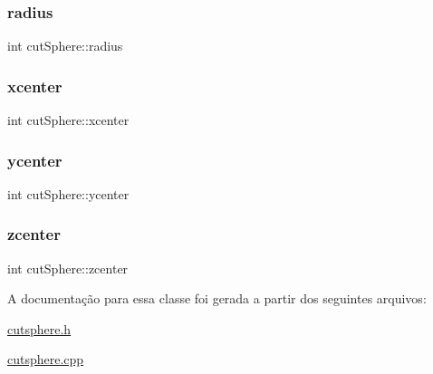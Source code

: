 \subsubsection{\texorpdfstring{radius}{radius}}
{\footnotesize\ttfamily int cut\+Sphere\+::radius\hspace{0.3cm}{\ttfamily [protected]}}

\mbox{\label{classcut_sphere_abc9077d50df05196d90450598bccff14}} 
\subsubsection{\texorpdfstring{xcenter}{xcenter}}
{\footnotesize\ttfamily int cut\+Sphere\+::xcenter\hspace{0.3cm}{\ttfamily [protected]}}

\mbox{\label{classcut_sphere_add926dd22a432d2e369af86885b06118}} 
\subsubsection{\texorpdfstring{ycenter}{ycenter}}
{\footnotesize\ttfamily int cut\+Sphere\+::ycenter\hspace{0.3cm}{\ttfamily [protected]}}

\mbox{\label{classcut_sphere_a6aee9641be3fe4586d21554291260003}} 
\subsubsection{\texorpdfstring{zcenter}{zcenter}}
{\footnotesize\ttfamily int cut\+Sphere\+::zcenter\hspace{0.3cm}{\ttfamily [protected]}}



A documentação para essa classe foi gerada a partir dos seguintes arquivos\+:\begin{DoxyCompactItemize}
\item 
\mbox{\hyperlink{cutsphere_8h}{cutsphere.\+h}}\item 
\mbox{\hyperlink{cutsphere_8cpp}{cutsphere.\+cpp}}\end{DoxyCompactItemize}
